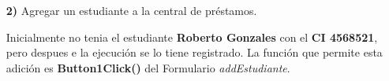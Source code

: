 \documentclass[12pt]{article}
\begin{document}
\begin{itemize}
\newpage
\item[\textbf{2)}] Agregar un estudiante a la central de préstamos.
\begin{center}
\end{center}
Inicialmente no tenia el estudiante \textbf{Roberto Gonzales }con el \textbf{CI 4568521}, pero despues e la ejecución se lo tiene registrado.  La función que permite esta adición es \textbf{Button1Click()} del Formulario \textit{addEstudiante}. 





\end{itemize}
\end{document}
